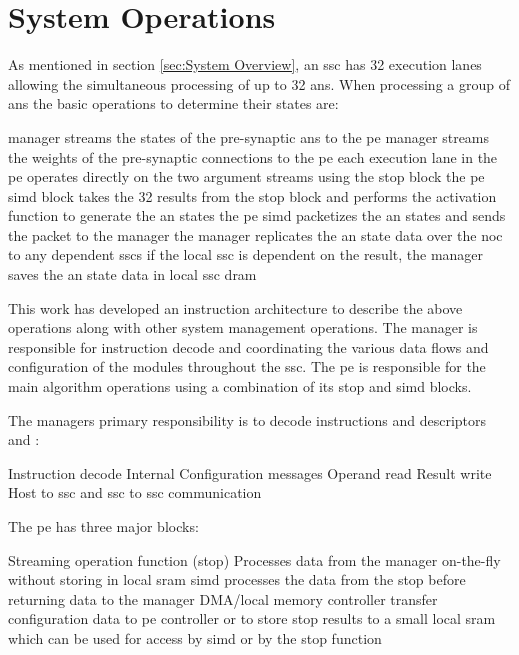 

\chapter{System Operations}
\label{sec:System Operations}

As mentioned in section \ref{sec:System Overview}, an \ac{ssc} has 32 execution lanes allowing the simultaneous processing of up to 32 \acp{an}.
When processing a group of \acp{an} the basic operations to determine their states are:
\begin{outline}
  \lbbcleanspace
  \1 manager streams the states of the pre-synaptic \acp{an} to the \ac{pe}
  \1 manager streams the weights of the pre-synaptic connections to the \ac{pe}
  \1 each execution lane in the \ac{pe} operates directly on the two argument streams using the \ac{stop} block
  \1 the \ac{pe} \ac{simd} block takes the 32 results from the \ac{stop} block and performs the activation function to generate the \ac{an} states
  \1 the \ac{pe} \ac{simd} packetizes the \ac{an} states and sends the packet to the manager
  \1 the manager replicates the \ac{an} state data over the \ac{noc} to any dependent \acp{ssc}
  \1 if the local \ac{ssc} is dependent on the result, the manager saves the \ac{an} state data in local \ac{ssc} \ac{dram}
\end{outline}

This work has developed an instruction architecture to describe the above operations along with other system management operations.
The manager is responsible for instruction decode and coordinating the various data flows and configuration of the modules throughout the \ac{ssc}.
The \ac{pe} is responsible for the main algorithm operations using a combination of its \ac{stop} and \ac{simd} blocks.

\iffalse

The managers primary responsibility is to decode instructions and descriptors and :

\begin{outline}
    \1 Instruction decode
    \1 Internal Configuration messages
    \1 Operand read
    \1 Result write
    \1 Host to \ac{ssc} and \ac{ssc} to \ac{ssc} communication
\end{outline}


The \ac{pe} has three major blocks:

\begin{outline}
    \1 Streaming operation function (\ac{stop})
      \2 Processes data from the manager on-the-fly without storing in local \ac{sram}
    \1 \ac{simd}
      \2 processes the data from the \ac{stop} before returning data to the manager
    \1 DMA/local memory controller
      \2 transfer configuration data to \ac{pe} controller or to store \ac{stop} results to a small local \ac{sram} which can be used for access by \ac{simd} or by the \ac{stop} function
\end{outline}


